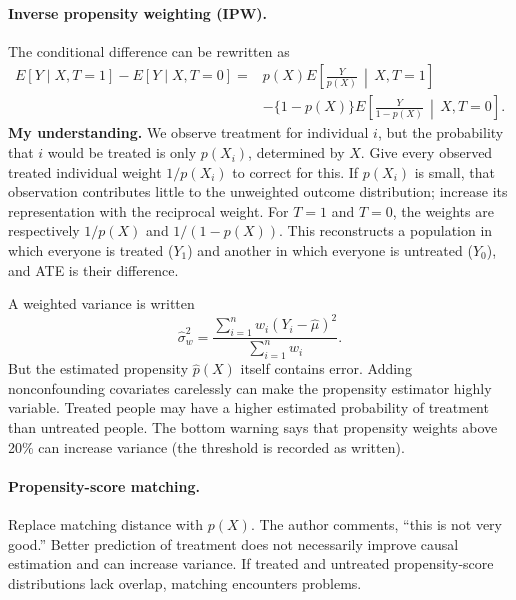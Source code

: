 {\paragraph{Inverse propensity weighting (IPW).}
The conditional difference can be rewritten as
\begin{align*}
E[Y\mid X,T=1]-E[Y\mid X,T=0]
={}&p(X)E\!\left[\frac{Y}{p(X)}\,\middle|\,X,T=1\right]\\
&-\{1-p(X)\}E\!\left[\frac{Y}{1-p(X)}\,\middle|\,X,T=0\right].
\end{align*}
\quad\textbf{My understanding.} We observe treatment for individual $i$, but the probability that $i$ would be treated is only $p(X_i)$, determined by $X$. Give every observed treated individual weight $1/p(X_i)$ to correct for this. If $p(X_i)$ is small, that observation contributes little to the unweighted outcome distribution; increase its representation with the reciprocal weight. For $T=1$ and $T=0$, the weights are respectively $1/p(X)$ and $1/(1-p(X))$. This reconstructs a population in which everyone is treated ($Y_1$) and another in which everyone is untreated ($Y_0$), and ATE is their difference.

A weighted variance is written
\[\hat\sigma_w^2=\frac{\sum_{i=1}^n w_i(Y_i-\hat\mu)^2}{\sum_{i=1}^n w_i}.\]
But the estimated propensity $\hat p(X)$ itself contains error. Adding nonconfounding covariates carelessly can make the propensity estimator highly variable. Treated people may have a higher estimated probability of treatment than untreated people. The bottom warning says that propensity weights above 20\% can increase variance (the threshold is recorded as written).

\paragraph{Propensity-score matching.}
Replace matching distance with $p(X)$. The author comments, ``this is not very good.'' Better prediction of treatment does not necessarily improve causal estimation and can increase variance. If treated and untreated propensity-score distributions lack overlap, matching encounters problems.

\begin{center}
\end{center}}
